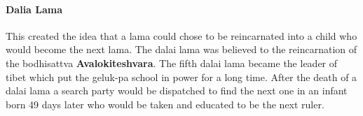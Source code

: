 \documentclass{article}
\begin{document}
\paragraph{Dalia Lama}
\label{par:dalia_lama}
This created the idea that a lama could chose to be reincarnated into a child who would become the next lama. The dalai lama was believed to the reincarnation of the bodhisattva \textbf{Avalokiteshvara}. The fifth dalai lama became the leader of tibet which put the geluk-pa school in power for a long time. After the death of a dalai lama a search party would be dispatched to find the next one in an infant born 49 days later who would be taken and educated to be the next ruler.
\end{document}
